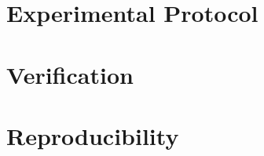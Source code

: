 
\section{Experimental Protocol}
\label{sec:protocol}


\section{Verification}
\label{sec:verification}


\section{Reproducibility}
\label{sec:reproducibility}

